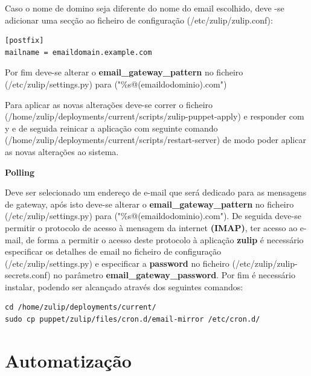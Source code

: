 \documentclass[11pt,a4paper]{report}%
\begin{document}
Caso o nome de domino seja diferente do nome do email escolhido, deve -se adicionar uma secção ao ficheiro de configuração (/etc/zulip/zulip.conf):

\begin{verbatim}
[postfix]
mailname = emaildomain.example.com
\end{verbatim}


Por fim deve-se alterar o \textbf{email\_gateway\_pattern} no ficheiro  (/etc/zulip/settings.py) para \newline ("\%s@(emaildodominio).com")

Para aplicar as novas alterações deve-se correr o ficheiro (/home/zulip/deployments/current/scripts/zulip-puppet-apply) e responder com y e de seguida reinicar a aplicação com seguinte comando \newline (/home/zulip/deployments/current/scripts/restart-server) de modo poder aplicar as novas alterações ao sistema. \newline

 \textbf{Polling} 
 
Deve ser selecionado um endereço de e-mail que será dedicado para as mensagens de gateway, após isto deve-se alterar o \textbf{email\_gateway\_pattern} no ficheiro  (/etc/zulip/settings.py) para  ("\%s@(emaildodominio).com").
 \newline
 De seguida deve-se permitir o protocolo de acesso à mensagem da internet \textbf{(IMAP)}, ter acesso ao e-mail, de forma a permitir o acesso deste protocolo à aplicação \textbf{zulip} é necessário especificar os detalhes de email no ficheiro de configuração (/etc/zulip/settings.py) e especificar a \textbf{password} no ficheiro (/etc/zulip/zulip-secrets.conf) no parâmetro \textbf{email\_gateway\_password}.
 Por fim é necessário instalar, podendo ser alcançado através dos seguintes comandos:\newline
 \begin{verbatim}
cd /home/zulip/deployments/current/
sudo cp puppet/zulip/files/cron.d/email-mirror /etc/cron.d/
\end{verbatim}

\newpage
\section{Automatização}
\end{document}
